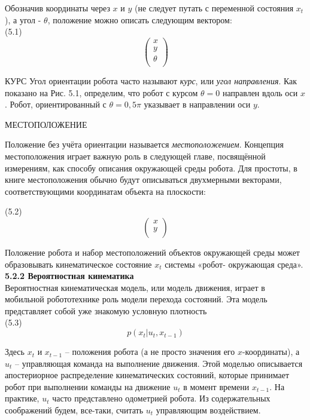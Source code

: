 \documentclass[10pt,a4paper]{article}
\begin{document}
Обозначив координаты через $x$ и $y$ (не следует путать с переменной состояния $x_t$), а угол - $\theta$, положение можно описать следующим вектором:\\

(5.1)
\begin{equation*}
\left(\begin{array}{c}
x\\
y\\
\theta\\
\end{array}\right)
\end{equation*}

КУРС
Угол ориентации робота часто называют \textit{курс}, или \textit{угол направления}. Как показано на Рис. 5.1, определим, что робот с курсом $\theta = 0$ направлен вдоль оси $x$. Робот, ориентированный с $\theta=0,5\pi$ указывает в направлении оси $y$.

МЕСТОПОЛОЖЕНИЕ 

Положение без учёта ориентации называется \textit{местоположением}. Концепция местоположения играет важную роль в следующей главе, посвящённой измерениям, как способу описания окружающей среды робота. Для простоты, в книге местоположения обычно будут описываться двухмерными векторами, соответствующими координатам объекта на плоскости:

(5.2)
\begin{equation*}
\left(\begin{array}{c}
x\\
y\\
\end{array}\right)
\end{equation*}

Положение робота и набор местоположений объектов окружающей среды может образовывать кинематическое состояние $x_t$ системы «робот- окружающая среда».\\

\textbf{5.2.2 Вероятностная кинематика}\\

Вероятностная кинематическая модель, или модель движения, играет в мобильной робототехнике роль модели перехода состояний. Эта модель представляет собой уже знакомую условную плотность\\

(5.3)
$$p(x_t|u_t,x_{t-1})$$ 

Здесь $x_t$ и $x_{t-1}$ – положения робота (а не просто значения его $x$-координаты), а
$u_t$ – управляющая команда на выполнение движения. Этой моделью описывается апостериорное распределение кинематических состояний, которые принимает робот при выполнении команды на движение $u_t$ в момент времени $x_{t-1}$. На практике, $u_t$ часто представлено одометрией робота. Из содержательных соображений будем, все-таки, считать $u_t$ управляющим воздействием.\\
\end{document}
